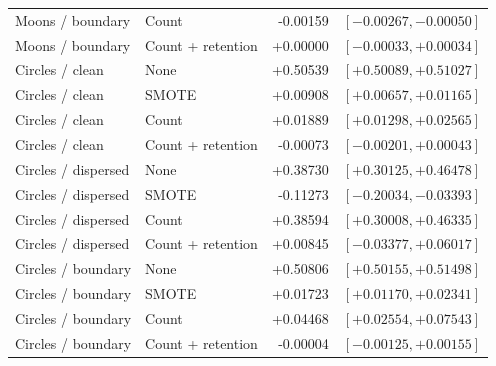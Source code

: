 \begin{table}[htbp]
\begin{tabular}{llrr}
Moons / boundary & Count & -0.00159 & $[-0.00267, -0.00050]$ \\
Moons / boundary & Count + retention & +0.00000 & $[-0.00033, +0.00034]$ \\
Circles / clean & None & +0.50539 & $[+0.50089, +0.51027]$ \\
Circles / clean & SMOTE & +0.00908 & $[+0.00657, +0.01165]$ \\
Circles / clean & Count & +0.01889 & $[+0.01298, +0.02565]$ \\
Circles / clean & Count + retention & -0.00073 & $[-0.00201, +0.00043]$ \\
Circles / dispersed & None & +0.38730 & $[+0.30125, +0.46478]$ \\
Circles / dispersed & SMOTE & -0.11273 & $[-0.20034, -0.03393]$ \\
Circles / dispersed & Count & +0.38594 & $[+0.30008, +0.46335]$ \\
Circles / dispersed & Count + retention & +0.00845 & $[-0.03377, +0.06017]$ \\
Circles / boundary & None & +0.50806 & $[+0.50155, +0.51498]$ \\
Circles / boundary & SMOTE & +0.01723 & $[+0.01170, +0.02341]$ \\
Circles / boundary & Count & +0.04468 & $[+0.02554, +0.07543]$ \\
Circles / boundary & Count + retention & -0.00004 & $[-0.00125, +0.00155]$ \\
\hline
\end{tabular}
\end{table}
\clearpage
